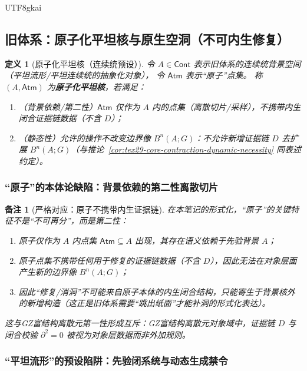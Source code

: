 \documentclass[12pt]{article}
\newtheorem{definition}{定义}[section]
\newtheorem{remark}{备注}[section]
\newcommand{\KouJing}{\texorpdfstring{表述约定}{表述约定}}
\newcommand{\GZMon}{\texorpdfstring{GZ富结构离散元}{GZ富结构离散元}}
\begin{document}
\begin{CJK*}{UTF8}{gkai}
\subsection{旧体系：原子化平坦核与原生空洞（不可内生修复）}
\label{subsec:tex29-ch14-old}

\begin{definition}[原子化平坦核（连续统预设）]
令 $A\in\mathsf{Cont}$ 表示旧体系的连续统背景空间（平坦流形/平坦连续统的抽象化对象），
令 $\mathsf{Atm}$ 表示“原子”点集。
称 $(A,\mathsf{Atm})$ 为\textbf{原子化平坦核}，若满足：
\begin{enumerate}
  \item （背景依赖/第二性）$\mathsf{Atm}$ 仅作为 $A$ 内的点集（离散切片/采样），不携带内生闭合证据链数据（不含 $D$）；
  \item （静态性）允许的操作不改变边界像 $B^n(A;G)$：不允许新增证据链 $D$ 去扩展 $B^n(A;G)$（与推论~\ref{cor:tex29-core-contraction-dynamic-necessity}
    同\KouJing）。
\end{enumerate}
\end{definition}

\subsubsection{“原子”的本体论缺陷：背景依赖的第二性离散切片}
\label{subsubsec:tex29-ch14-old-atom}

\begin{remark}[严格对应：原子不携带内生证据链]
在本笔记的形式化，“原子”的关键特征不是“不可再分”，而是\emph{第二性}：
\begin{enumerate}
  \item 原子仅作为 $A$ 内点集 $\mathsf{Atm}\subseteq A$ 出现，其存在语义依赖于先验背景 $A$；
  \item 原子点集不携带任何用于修复的证据链数据（不含 $D$），因此无法在对象层面产生新的边界像 $B^n(A;G)$；
  \item 因此“修复/消洞”不可能来自原子本体的内生闭合结构，只能寄生于背景核外的新增构造（这正是旧体系需要“跳出纸面”才能补洞的形式化表达）。
\end{enumerate}
这与\GZMon{}第一性形成互斥：\GZMon{}对象域中，证据链 $D$ 与闭合校验 $\partial^2=0$ 被视为对象层数据而非外加规则。
\end{remark}

\subsubsection{“平坦流形”的预设陷阱：先验闭系统与动态生成禁令}
\label{subsubsec:tex29-ch14-old-flat}


\end{CJK*}
\end{document}

